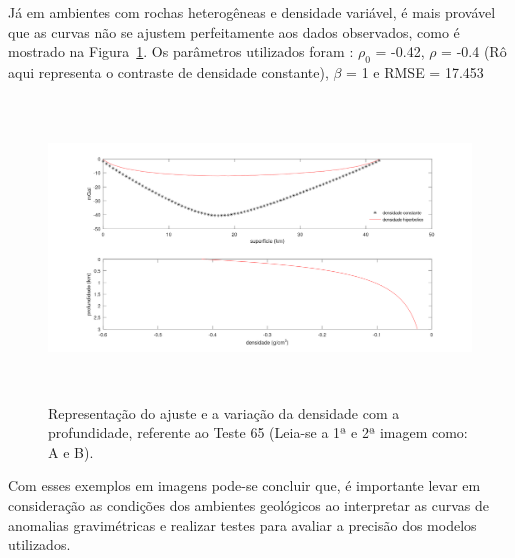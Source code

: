 \vspace{0.65cm}

Já em ambientes com rochas heterogêneas e densidade variável, é mais provável que as curvas não se ajustem perfeitamente aos dados observados, como é mostrado na Figura~\ref{Figura 8}. Os parâmetros utilizados foram : $\rho_0$ = -0.42, $\rho$ = -0.4 (Rô aqui representa o contraste de densidade constante), $\beta$ = 1 e RMSE = 17.453

        \begin{figure}[!h]  
                \centering
                \includegraphics[height=8cm]{figure/Imagens 1a questao/Teste 65.png}
                \caption{Representação do ajuste e a variação da densidade com a profundidade, referente ao Teste 65 (Leia-se a 1ª e 2ª imagem como: A e B).}
                \label{Figura 8}
        \end{figure}
        
 Com esses exemplos em imagens pode-se concluir que, é importante levar em consideração as condições dos ambientes geológicos ao interpretar as curvas de anomalias gravimétricas e realizar testes para avaliar a precisão dos modelos utilizados.

